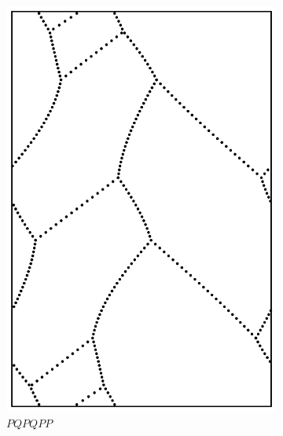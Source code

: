 \documentclass[12pt,twoside]{reedthesis}
\theoremstyle{definition}
\begin{document}
\begin{figure}[h]
\begin{subfigure}[t]{0.24\textwidth}
    \includegraphics[width=\textwidth]{figures/string_cheese_appendix/pqpqpp.pdf}
    \caption*{$PQPQPP$}
    \vspace{5mm}
  \end{subfigure}
  \hfill
  \begin{subfigure}[t]{0.24\textwidth}

\end{subfigure}
\end{figure}
\end{document}

